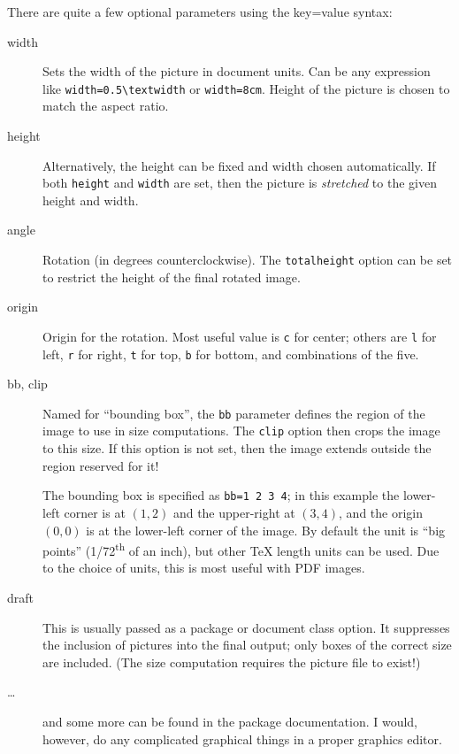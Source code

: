 There are quite a few optional parameters using the key=value syntax:

\begin{description}
\item[width] Sets the width of the picture in document units.
    Can be any expression like \verb|width=0.5\textwidth| or \verb|width=8cm|.
    Height of the picture is chosen to match the aspect ratio.
\item[height] Alternatively, the height can be fixed and width chosen automatically.
    If both \verb|height| and \verb|width| are set,
    then the picture is \emph{stretched} to the given height and width.
\item[angle] Rotation (in degrees counterclockwise).
    The \verb|totalheight| option can be set to restrict the height of the final rotated image.
\item[origin] Origin for the rotation.
    Most useful value is \verb|c| for center;
    others are \verb|l| for left, \verb|r| for right,
    \verb|t| for top, \verb|b| for bottom, and combinations of the five.
\item[bb, clip] Named for ``bounding box'', the \verb|bb| parameter defines
    the region of the image to use in size computations.
    The \verb|clip| option then crops the image to this size.
    If this option is not set, then the image extends outside the region reserved for it!

    The bounding box is specified as \verb|bb=1 2 3 4|; in this example
    the lower-left corner is at $(1,2)$ and the upper-right at $(3,4)$,
    and the origin $(0,0)$ is at the lower-left corner of the image.
    By default the unit is ``big points'' (1/72\textsuperscript{th} of an inch),
    but other \TeX{} length units can be used.
    Due to the choice of units, this is most useful with PDF images.
\item[draft] This is usually passed as a package or document class option.
    It suppresses the inclusion of pictures into the final output;
    only boxes of the correct size are included.
    (The size computation requires the picture file to exist!)
\item[\dots] and some more can be found in the package documentation.
    I would, however, do any complicated graphical things in a proper graphics editor.
\end{description}

